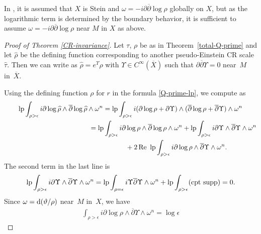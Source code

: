 \documentclass[10pt,a4paper]{amsart}
\numberwithin{equation}{section}
\begin{document}
In \cite[Theorem 5.6]{Hirachi}, it is assumed that $X$ is Stein and $\omega=-i\partial\overline{\partial}\log\rho$ globally on $X$, but as the logarithmic term is determined by the boundary behavior, it is suf\/f\/icient to assume $\omega=-i\partial\overline{\partial}\log\rho$ near $M$ in $X$ as above.

\begin{proof}[Proof of Theorem \ref{CR-invariance}] Let $\tau$, $\rho$ be as in Theorem~\ref{total-Q-prime} and let $\widehat\rho$ be the def\/ining function corresponding to another pseudo-Einstein CR scale $\widehat\tau$. Then we can write as $\widehat\rho=e^{\Upsilon}\rho$ with $\Upsilon\in C^\infty(\overline X)$ such that $\partial\overline{\partial}\Upsilon=0$ near~$M$ in~$\overline X$.

Using the def\/ining function $\rho$ for $r$ in the formula \eqref{Q-prime-lp}, we compute as
\begin{gather*}
\operatorname{lp}\int_{\rho>\epsilon} i\partial\log \widehat\rho\wedge \overline{\partial}\log\widehat\rho\wedge \omega^n=
\operatorname{lp}\int_{\rho>\epsilon} i(\partial\log \rho+\partial\Upsilon)\wedge (\overline{\partial}\log\rho+\overline{\partial}\Upsilon)\wedge \omega^n \\
\hphantom{\operatorname{lp}\int_{\rho>\epsilon} i\partial\log \widehat\rho\wedge \overline{\partial}\log\widehat\rho\wedge \omega^n}{}
 =\operatorname{lp}\int_{\rho>\epsilon} i\partial\log\rho\wedge \overline{\partial}\log\rho\wedge \omega^n +\operatorname{lp}\int_{\rho>\epsilon} i\partial\Upsilon\wedge \overline{\partial}\Upsilon\wedge \omega^n \\
\hphantom{\operatorname{lp}\int_{\rho>\epsilon} i\partial\log \widehat\rho\wedge \overline{\partial}\log\widehat\rho\wedge \omega^n=}{}
 +2\operatorname{Re}\ \operatorname{lp}\int_{\rho>\epsilon} i\partial\log\rho\wedge \overline{\partial}\Upsilon\wedge \omega^n.
\end{gather*}
The second term in the last line is
\begin{gather*}
\operatorname{lp}\int_{\rho>\epsilon} i\partial\Upsilon\wedge \overline{\partial}\Upsilon\wedge \omega^n=\operatorname{lp}\int_{\rho=\epsilon} i\Upsilon\overline{\partial}\Upsilon\wedge \omega^n+\operatorname{lp}\int_{\rho>\epsilon}({\rm cpt\ supp})=0.
\end{gather*}
Since $\omega={\rm d}(\vartheta/\rho)$ near~$M$ in~$X$, we have
\begin{gather*}
\int_{\rho>\epsilon} i\partial\log\rho\wedge \overline{\partial}\Upsilon\wedge \omega^n =\log\epsilon

\end{gather*}
\end{proof}
\end{document}
